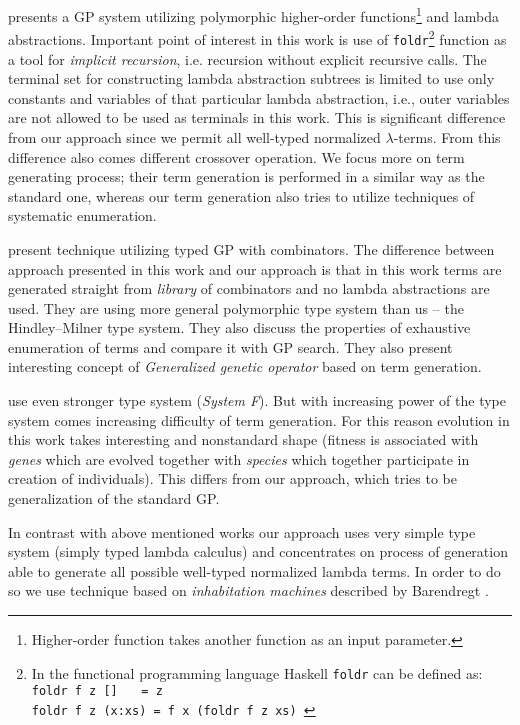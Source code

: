 \documentclass[11pt]{article}
\newcommand{\lterms}{$\lambda$-terms\xspace}
\begin{document}
\begin{article}
\cite{yu01} presents a GP system utilizing
polymorphic higher-order functions\footnote{Higher-order 
function takes another function as an input parameter.
} and lambda abstractions.
Important point of interest in this work is use of \texttt{foldr}\footnote{ In the functional programming language Haskell \texttt{foldr} can be defined as:\\ \texttt{foldr f z [] $~~~$  = z\\ 
foldr f z (x:xs) = f x (foldr f z xs) }} function as a tool for \textit{implicit recursion},
i.e. recursion without explicit recursive calls. 
The terminal set for constructing lambda abstraction subtrees 
is limited to use only constants and variables of that particular
lambda abstraction, i.e., outer variables are not allowed to be used
as terminals in this work. This is significant difference from our approach 
since we permit all well-typed normalized \lterms. From this difference also
comes different crossover operation. We focus more on term generating process; 
their term generation is performed in a similar way as the standard one, 
whereas our term generation also tries to utilize techniques of systematic enumeration. 

\cite{kes} present technique 
utilizing typed GP with combinators.
The difference between approach presented in this work
and our approach is that in this work terms are generated
straight from \textit{library} of combinators and no lambda abstractions
are used. They are using more general polymorphic type system than us
-- the Hindley–Milner type system. They also discuss the 
properties of exhaustive enumeration of terms and compare it with GP search.  
They also present interesting concept of \textit{Generalized
genetic operator} based on term generation. 

\cite{binard2008genetic} use even 
stronger type system (\textit{System F}).  
But with increasing power of the type system comes increasing difficulty of term generation.
For this reason evolution in this work takes interesting and nonstandard shape 
(fitness is associated with \textit{genes} which are evolved together with \textit{species}
which together participate in creation of individuals).
This differs from our approach, which tries to be generalization of
the standard GP\cite{koza92}.

In contrast with above mentioned works our approach uses very simple type system 
(simply typed lambda calculus) and concentrates on process of generation  
able to generate all possible well-typed normalized lambda terms. In order to do
so we use technique based on \textit{inhabitation machines} 
described by Barendregt \cite{barendregt10}.    





\end{article}
\end{document}
